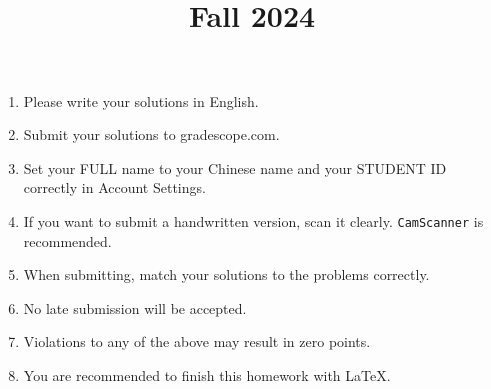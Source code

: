\documentclass[11pt, addpoints, answers]{exam}
\title{
	\CourseName\\
	Fall 2024\\
	\HomeworkNO
}
\author{}
\date{\DueDate}
\newcommand{\ttt}{\texttt}
\begin{document}
\maketitle

\begin{enumerate}
	\item Please write your solutions in English.
	\item Submit your solutions to gradescope.com.
	\item Set your FULL name to your Chinese name and your STUDENT ID correctly in Account Settings.
	\item If you want to submit a handwritten version, scan it clearly. \ttt{CamScanner} is recommended.
	\item When submitting, match your solutions to the problems correctly.
	\item No late submission will be accepted.
	\item Violations to any of the above may result in zero points.
 	\item You are recommended to finish this homework with \LaTeX.
\end{enumerate}

\newpage

\begin{questions}
    
    
    \newpage
    
    
    
    \newpage
    
    
    
    \newpage

    

    \newpage

    

\end{questions}
\end{document}
